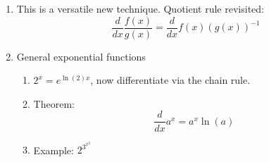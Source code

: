 \documentclass{article}
\begin{document}
\begin{enumerate}
\item This is a versatile new technique. Quotient rule revisited:
$$
\frac{d}{dx} \frac{f(x)}{g(x)} = \frac{d}{dx} f(x)(g(x))^{-1}
$$


\item General exponential functions 
\begin{enumerate}
\item $2^x = e^{\ln(2)x}$, now differentiate via the chain rule.
\item Theorem:
$$
\frac{d}{dx}a^x = a^x\ln (a)
$$
\item Example: $2^{3^{x^2}}$
\end{enumerate}
\end{enumerate}


\end{document}
